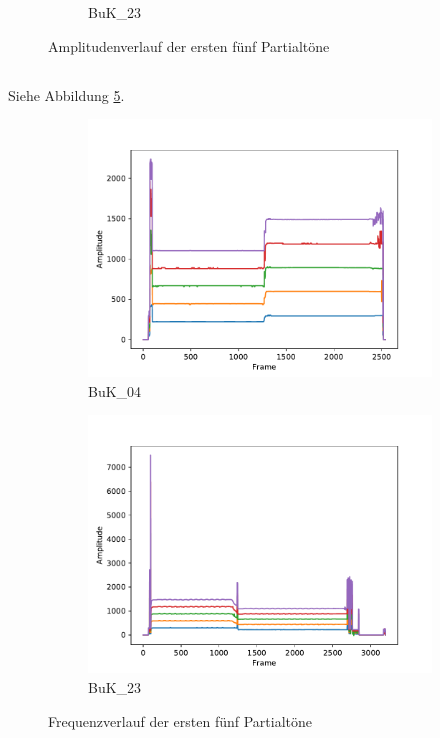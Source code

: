 \begin{figure}[H]
\begin{subfigure}{.5\textwidth}
        \caption{BuK\_23}
        \label{fig:sub2}
    \end{subfigure}
    \caption{Amplitudenverlauf der ersten fünf Partialtöne}
    \label{fig:ampl}
\end{figure}

\subsection{}
Siehe Abbildung \ref{fig:freq}.

\begin{figure}[H]
    \centering
    \begin{subfigure}{.5\textwidth}
        \centering
        \includegraphics[width=\linewidth]{Figures/Buk04_frequencies.pdf}
        \caption{BuK\_04}
        \label{fig:sub1}
    \end{subfigure}%
    \begin{subfigure}{.5\textwidth}
        \centering
        \includegraphics[width=\linewidth]{Figures/Buk23_frequencies.pdf}
        \caption{BuK\_23}
        \label{fig:sub2}
    \end{subfigure}
    \caption{Frequenzverlauf der ersten fünf Partialtöne}
    \label{fig:freq}
\end{figure}


